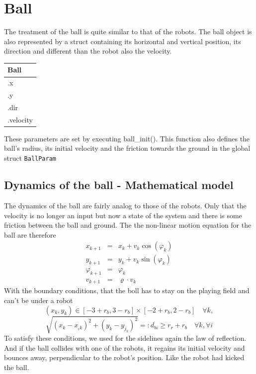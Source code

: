 \section{Ball} \label{Ballsection}

The treatment of the ball is quite similar to that of the robots. The ball object is also represented by a struct containing its horizontal and vertical position, its direction and different than the robot also the velocity.
\begin{center}
	\begin{tabular}{| l |} \hline
		Ball \\ \hline
		.x \\
		.y \\
		.dir \\
		.velocity \\ \hline
	\end{tabular}
\end{center}
 These parameters are set by executing {\selectfont ball\_init()}. This function also defines the ball's radius, its initial velocity and the friction towards the ground in the global struct \texttt{BallParam}
 
\subsection*{Dynamics of the ball - Mathematical model}

%
The dynamics of the ball are fairly analog to those of the robots. Only that the velocity is no longer an input but now a state of the system and there is some friction between the ball and ground. 
The the non-linear motion equation for the ball are therefore
\begin{eqnarray*}
	x_{{k+1}} &=& x_{k} + v_{k} \cos(\varphi_{k}) \\
	y_{{k+1}} &=& y_{k} + v_{k} \sin(\varphi_{k}) \\
	\varphi_{{k+1}} &=& \varphi_{k}\\
	v_{{k+1}} &=& \varrho \cdot v_{k}
\end{eqnarray*}
With the boundary conditions, that the boll has to stay on the playing field and can't be under a robot
	\[ (x_{k},y_{k}) \in [-3+r_b,3-r_b]\times[-2+r_b,2-r_b] \quad \forall k, 
	\]
	\[ \sqrt{(x_{k}-x_{_i{k}})^2 + (y_{k}-y_{j_{k}})^2} =: d_{bi} \geq r_r + r_b \quad \forall k, \forall i
	\]
To satisfy these conditions, we used for the sidelines again the law of reflection.  And if the ball collides with one of the robots, it regains its initial velocity and bounces away, perpendicular to the robot's position. Like the robot had kicked the ball.


